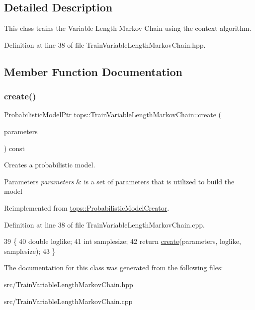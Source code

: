 \subsection{Detailed Description}
This class trains the Variable Length Markov Chain using the context algorithm. 

Definition at line 38 of file Train\+Variable\+Length\+Markov\+Chain.\+hpp.



\subsection{Member Function Documentation}
\mbox{\label{classtops_1_1TrainVariableLengthMarkovChain_a67d4799e147f66deb1646d1ba45f7e65}} 
\subsubsection{\texorpdfstring{create()}{create()}}
{\footnotesize\ttfamily Probabilistic\+Model\+Ptr tops\+::\+Train\+Variable\+Length\+Markov\+Chain\+::create (\begin{DoxyParamCaption}\item[{\hyperlink{classtops_1_1ProbabilisticModelParameters}{Probabilistic\+Model\+Parameters} \&}]{parameters }\end{DoxyParamCaption}) const\hspace{0.3cm}{\ttfamily [virtual]}}



Creates a probabilistic model. 


\begin{DoxyParams}{Parameters}
{\em parameters} & is a set of parameters that is utilized to build the model \\
\hline
\end{DoxyParams}


Reimplemented from \hyperlink{classtops_1_1ProbabilisticModelCreator_afed6c8ffa45fff446bdaa8b533da8f7c}{tops\+::\+Probabilistic\+Model\+Creator}.



Definition at line 38 of file Train\+Variable\+Length\+Markov\+Chain.\+cpp.


\begin{DoxyCode}
39                                                                  \{
40         \textcolor{keywordtype}{double} loglike;
41         \textcolor{keywordtype}{int} samplesize;
42         \textcolor{keywordflow}{return} \hyperlink{classtops_1_1TrainVariableLengthMarkovChain_a67d4799e147f66deb1646d1ba45f7e65}{create}(parameters, loglike, samplesize);
43 \}
\end{DoxyCode}


The documentation for this class was generated from the following files\+:\begin{DoxyCompactItemize}
\item 
src/Train\+Variable\+Length\+Markov\+Chain.\+hpp\item 
src/Train\+Variable\+Length\+Markov\+Chain.\+cpp\end{DoxyCompactItemize}
